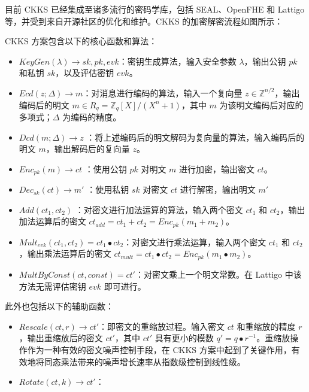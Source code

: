 目前 CKKS 已经集成至诸多流行的密码学库，包括 SEAL、OpenFHE 和 Lattigo 等\cite{sealcrypto,OpenFHE,Mouchet2020LattigoAM}，并受到来自开源社区的优化和维护。CKKS 的加密解密流程如图所示：


CKKS 方案包含以下的核心函数和算法：

\begin{itemize}
    \item $KeyGen(\lambda) \rightarrow sk, pk, evk$：密钥生成算法，输入安全参数 $\lambda$，输出公钥 $pk$ 和私钥 $sk$，以及评估密钥 $evk$。
    \item $Ecd(z; \Delta) \rightarrow m$：对消息进行编码的算法，输入一个复向量 $z \in \mathbb{Z}^{n/2}$，输出编码后的明文 $m \in R_q = \mathbb{Z}_q[X]/(X^n+1)$，其中 $m$ 为该明文编码后对应的多项式；$\Delta$ 为编码的精度。
    \item $Dcd(m; \Delta) \rightarrow z$ ：将上述编码后的明文解码为复向量的算法，输入编码后的明文 $m$，输出解码后的复向量 $z$。
    \item $Enc_{pk}(m) \rightarrow ct$ ：使用公钥 $pk$ 对明文 $m$ 进行加密，输出密文 $ct$。
    \item $Dec_{sk}(ct) \rightarrow m'$ ：使用私钥 $sk$ 对密文 $ct$ 进行解密，输出明文 $m'$
    \item $Add(ct_1, ct_2)$ ：对密文进行加法运算的算法，输入两个密文 $ct_1$ 和 $ct_2$，输出加法运算后的密文 $ct_{add} = ct_1 + ct_2 = Enc_{pk}(m_1 + m_2)$。
    \item $Mult_{evk}(ct_1, ct_2) = ct_1 \bullet ct_2$：对密文进行乘法运算，输入两个密文 $ct_1$ 和 $ct_2$，输出乘法运算后的密文 $ct_{mult} = ct_1 \bullet ct_2 = Enc_{pk}(m_1 \bullet m_2)$。
    \item $MultByConst(ct, const) = ct'$：对密文乘上一个明文常数。在 Lattigo 中该方法无需评估密钥 $evk$ 即可进行。\cite{lattigoRepo}
\end{itemize}

此外也包括以下的辅助函数：

\begin{itemize}
    \item $Rescale(ct, r) \rightarrow ct'$：即密文的重缩放过程。输入密文 $ct$ 和重缩放的精度 $r$，输出重缩放后的密文 $ct'$，其中 $ct'$ 具有更小的模数 $q' = q \bullet r^{-1}$。重缩放操作作为一种有效的密文噪声控制手段，在 CKKS 方案中起到了关键作用，有效地将同态乘法带来的噪声增长速率从指数级控制到线性级。
    \item $Rotate(ct, k) \rightarrow ct'$：
\end{itemize}

